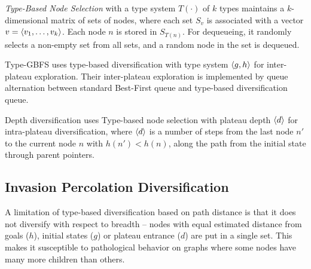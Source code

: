 \begin{defi}
 \emph{Type-Based Node Selection} \cite{xie14type}
with a type system $T(\cdot)$ of $k$ types maintains a $k$-dimensional matrix of sets of nodes,
 where each set $S_v$ is associated with a vector $v={\left<v_1,\ldots,v_k\right>}$.
 Each node $n$ is stored in $S_{T(n)}$.
 For dequeueing, it randomly selects a non-empty set from all sets,
 and a random node in the set is dequeued.
\end{defi}


Type-GBFS \cite{xie14type} uses type-based diversification with type system ${\left<g,h\right>}$ for
inter-plateau exploration. Their inter-plateau exploration is implemented by queue alternation
\cite{RogerH10} between standard Best-First queue and type-based diversification queue.

Depth diversification \cite{Asai2016} %
uses Type-based node selection with plateau depth ${\left<d\right>}$ for
intra-plateau diversification, where ${\left<d\right>}$ is a number of steps from the last node $n'$ to the
current node $n$ with $h(n')<h(n)$, along the path from the initial state through parent pointers.

\subsection{Invasion Percolation Diversification}

A limitation of type-based diversification based on path distance is that it does not diversify with
respect to breadth -- nodes with equal estimated distance from goals ($h$), initial states ($g$) or
plateau entrance ($d$) are put in a single set.  This makes it susceptible to pathological behavior
on graphs where some nodes have many more children than others.


